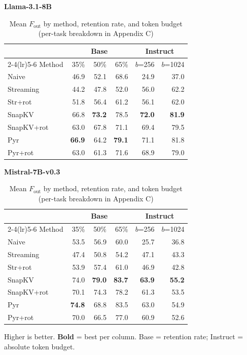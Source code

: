 \documentclass[10pt,letterpaper]{article}
\begin{document}
\begin{table}[H]
\centering
\small
\captionsetup{justification=centering}
\caption{Mean \(F_{\text{out}}\) by method, retention rate, and token budget (per-task breakdown in Appendix C)}
\label{tab:t4}
\begin{minipage}[t]{0.49\textwidth}
\centering
\textbf{Llama-3.1-8B}\\[0.4em]
\begin{tabular}{@{}lrrrrr@{}}
\toprule
& \multicolumn{3}{c}{Base} & \multicolumn{2}{c}{Instruct}\\
\cmidrule(lr){2-4}\cmidrule(lr){5-6}
Method & 35\% & 50\% & 65\% & $b$=256 & $b$=1024\\
\midrule
Naive      & 46.9 & 52.1 & 68.6 & 24.9 & 37.0\\
Streaming  & 44.2 & 47.8 & 52.0 & 56.0 & 62.2\\
Str+rot    & 51.8 & 56.4 & 61.2 & 56.1 & 62.0\\
SnapKV     & 66.8 & \textbf{73.2} & 78.5 & \textbf{72.0} & \textbf{81.9}\\
SnapKV+rot & 63.0 & 67.8 & 71.1 & 69.4 & 79.5\\
Pyr        & \textbf{66.9} & 64.2 & \textbf{79.1} & 71.1 & 81.8\\
Pyr+rot    & 63.0 & 61.3 & 71.6 & 68.9 & 79.0\\
\bottomrule
\end{tabular}
\end{minipage}%
\hfill
\begin{minipage}[t]{0.49\textwidth}
\centering
\textbf{Mistral-7B-v0.3}\\[0.4em]
\begin{tabular}{@{}lrrrrr@{}}
\toprule
& \multicolumn{3}{c}{Base} & \multicolumn{2}{c}{Instruct}\\
\cmidrule(lr){2-4}\cmidrule(lr){5-6}
Method & 35\% & 50\% & 65\% & $b$=256 & $b$=1024\\
\midrule
Naive      & 53.5 & 56.9 & 60.0 & 25.7 & 36.8\\
Streaming  & 47.4 & 50.8 & 54.2 & 47.1 & 43.3\\
Str+rot    & 53.9 & 57.4 & 61.0 & 46.9 & 42.8\\
SnapKV     & 74.0 & \textbf{79.0} & \textbf{83.7} & \textbf{63.9} & \textbf{55.2}\\
SnapKV+rot & 70.1 & 74.3 & 78.2 & 61.3 & 53.5\\
Pyr        & \textbf{74.8} & 68.8 & 83.5 & 63.0 & 54.9\\
Pyr+rot    & 70.0 & 66.5 & 77.0 & 60.9 & 52.6\\
\bottomrule
\end{tabular}
\end{minipage}
\par\smallskip
Higher is better. \textbf{Bold} = best per column. Base = retention rate; Instruct = absolute token budget.
\end{table}
\end{document}
